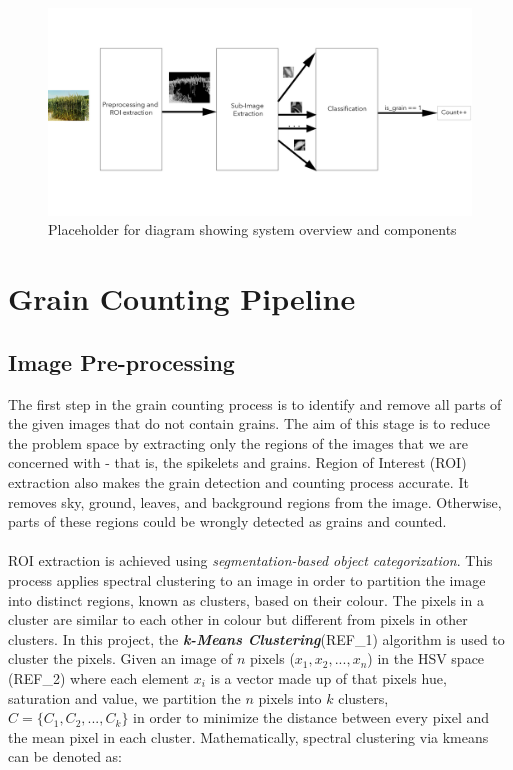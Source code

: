 \smallskip

\begin{figure}[ht!]
\centering
\includegraphics[scale=.4]{Images/design_pipeline}
\caption{Placeholder for diagram showing system overview and components}
\label{fig1}
\end{figure}

\smallskip

\goodbreak
\section{Grain Counting Pipeline}
\subsection{Image Pre-processing}
The first step in the grain counting process is to identify and remove all parts of the given images that do not contain grains. The aim of this stage is to reduce the problem space by extracting only the regions of the images that we are concerned with - that is, the spikelets and grains. Region of Interest (ROI) extraction also makes the grain detection and counting process accurate. It removes sky, ground, leaves, and background regions from the image. Otherwise, parts of these regions could be wrongly detected as grains and counted.\\ \\
%
ROI extraction is achieved using \textit{segmentation-based object categorization}. This process applies spectral clustering to an image in order to partition the image into distinct regions, known as clusters, based on their colour. The pixels in a cluster are similar to each other in colour but different from pixels in other clusters. In this project, the \textit{\textbf{k-Means Clustering}}(REF\_1) algorithm is used to cluster the pixels. Given an image of $n$ pixels ($x_1, x_2, ..., x_n$) in the HSV space (REF\_2) where each element $x_i$ is a vector made up of that pixels hue, saturation and value, we partition the $n$ pixels into $k$ clusters, $C = \{C_1, C_2, ..., C_k\}$ in order to minimize the distance between every pixel and the mean pixel in each cluster. Mathematically, spectral clustering via kmeans can be denoted as:

